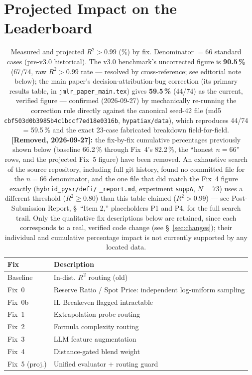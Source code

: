 \documentclass[twoside,11pt]{article}
\begin{document}
\section{Projected Impact on the Leaderboard}
\label{sec:leaderboard}

\begin{table}[h]
\centering
\caption{Measured and projected $R^2 > 0.99$ (\%) by fix.
         Denominator $= 66$ standard cases (pre-v3.0 historical). The
         v3.0 benchmark's uncorrected figure is \textbf{90.5\,\%} (67/74, raw
         $R^2>0.99$ rate --- resolved by cross-reference; see editorial
         note below); the
         main paper's decision-attribution-bug correction
         (its primary results table, in \texttt{jmlr\_paper\_main.tex})
         gives \textbf{59.5\,\%} (44/74) as the current, verified figure ---
         confirmed (2026-09-27) by mechanically re-running the correction
         rule directly against the canonical seed-42 file (md5
         \texttt{cbf503d0b3985b4c1bccf7ed18e0316b}, \texttt{hypatiax/data}), which reproduces
         44/74 = 59.5\,\% and the exact 23-case fabricated breakdown
         field-for-field. \textbf{[Removed, 2026-09-27]:} the fix-by-fix
         cumulative percentages previously shown below (baseline 66.2\,\%
         through Fix~4's 82.2\,\%, the ``honest $n{=}66$'' rows, and the
         projected Fix~5 figure) have been removed. An exhaustive search of
         the source repository, including full git history, found no
         committed file for the $n{=}66$ denominator, and the one file that
         did match the Fix~4 figure exactly (\texttt{hybrid\_pysr/defi/}
         \texttt{\_report.md}, experiment \texttt{suppA}, $N=73$) uses a
         different threshold ($R^2\geq0.80$) than this table claimed
         ($R^2>0.99$) --- see Post-Submission Report, \S~``Item 2,''
         placeholders P1 and P4, for the full search trail. Only the
         qualitative fix descriptions below are retained, since each
         corresponds to a real, verified code change (see
         \S~\ref{sec:changes}); their individual and cumulative
         percentage impact is not currently supported by any located data.}
\label{tab:projected}
\begin{tabular}{ll}
\toprule
\textbf{Fix} & \textbf{Description} \\
\midrule
Baseline    & In-dist. $R^2$ routing (old) \\
Fix~0       & Reserve Ratio / Spot Price: independent log-uniform sampling \\
Fix~0b      & IL Breakeven flagged intractable \\
Fix~1       & Extrapolation probe routing \\
Fix~2       & Formula complexity routing \\
Fix~3       & LLM feature augmentation \\
Fix~4       & Distance-gated blend weight \\
Fix~5 (proj.) & Unified evaluator + routing guard \\
\bottomrule
\end{tabular}
\end{table}
\end{document}
